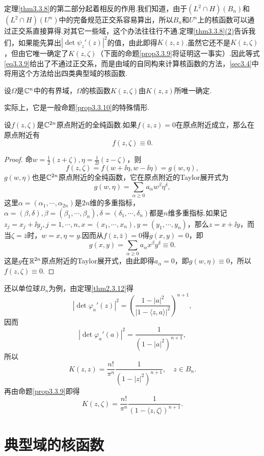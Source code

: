 定理\ref{thm3.3.8}的第二部分起着相反的作用.我们知道，由于$(L^2\cap H)(B_n)$和$(L^2\cap H)(U^n)$中的完备规范正交系容易算出，所以$B_n$和$U^n$上的核函数可以通过正交系直接算得.对其它一些域，这个办法往往行不通.定理\ref{thm3.3.8}\hyperlink{3.3.8}{(2)}告诉我们，如果能先算出$|\det\psi_z'(z)|^2$的值，由此即得$K(z,z)$.虽然它还不是$K(z,\zeta)$，但由它唯一确定了$K(z,\zeta)$（下面的命题\ref{prop3.3.9}将证明这一事实）.因此等式\eqref{eq3.3.9}给出了不通过正交系，而是由域的自同构来计算核函数的方法，\ref{sec3.4}中将用这个方法给出四类典型域的核函数.
\begin{prop}\label{prop3.3.9}
	设$\Omega$是$\mathbb C^n$中的有界域，$\Omega$的核函数$K(z,\zeta)$由$K(z,z)$所唯一确定.
\end{prop}
实际上，它是一般命题\ref{prop3.3.10}的特殊情形.
\begin{prop}\label{prop3.3.10}
	设$f(z,\zeta)$是$\mathbb C^{2n}$原点附近的全纯函数.如果$f(z,z)=0$在原点附近成立，那么在原点附近有
	\[f(z,\zeta)\equiv0.\]
\end{prop}
\begin{proof}
	命$w=\frac12(z+\zeta),\eta=\frac1{2\ii}(z-\zeta)$，则
	\[f(z,\zeta)=f(w+\ii\eta,w-\ii\eta)=g(w,\eta),\]
	$g(w,\eta)$也是$\mathbb C^{2n}$原点附近的全纯函数，它在原点附近的Taylor展开式为
	\[g(w,\eta)=\sum_{\alpha\ge0}a_\alpha w^\beta \eta^\delta,\]
	这里$\alpha=(\alpha_1,\cdots,\alpha_{2n})$是$2n$维的多重指标，$\alpha=(\beta,\delta),\beta=(\beta_1,\cdots,\beta_n),\delta=(\delta_1,\cdots,\delta_n)$都是$n$维多重指标.如果记$z_j=x_j+\ii y_j,j=1,\cdots,n,x=(x_1,\cdots,x_n),y=(y_1,\cdots,y_n)$，那么$z=x+\ii y$，而当$\zeta=\bar{z}$时，$w=x,\eta=y$.因而从$f(z,\bar{z})=0$得$g(x,y)=0$，即
	\[g(x,y)=\sum_{\alpha\ge0}a_\alpha x^\beta y^\delta\equiv0.\]
	这是$g$在$\mathbb R^{2n}$原点附近的Taylor展开式，由此即得$a_\alpha=0$，即$g(w,\eta)\equiv0$，所以$f(z,\zeta)\equiv0$.
\end{proof}
还以单位球$B_n$为例，由定理\ref{thm2.3.12}得
\[|\det\varphi_a'(z)|^2=\left(\frac{1-|a|^2}{|1-\langle z,a\rangle|^2}\right)^{n+1},\]
因而
\[|\det\varphi_a'(a)|^2=\frac1{(1-|a|^2)^{n+1}},\]
所以
\[K(z,z)=\frac{n!}{\pi^n}\frac1{(1-|z|^2)^{n+1}},\quad z\in B_n.\]
再由命题\ref{prop3.3.9}即得
\[K(z,\zeta)=\frac{n!}{\pi^n}\frac1{(1-\langle z,\zeta\rangle)^{n+1}}.\]
\section{典型域的核函数\label{sec3.4}}
